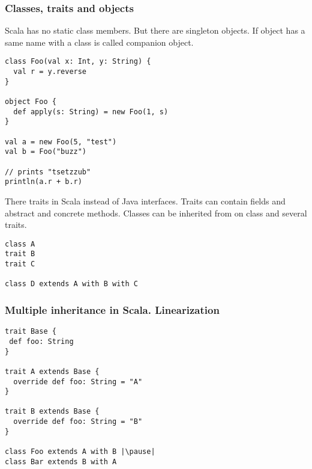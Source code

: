 \begin{frame}[fragile]
\frametitle{Classes, traits and objects}

Scala has no static class members. But there are singleton objects. If object has a same name with a class is called companion object.

\begin{lstlisting}
class Foo(val x: Int, y: String) {
  val r = y.reverse
}

object Foo {
  def apply(s: String) = new Foo(1, s)
}

val a = new Foo(5, "test")
val b = Foo("buzz")

// prints "tsetzzub"
println(a.r + b.r)
\end{lstlisting}

There traits in Scala instead of Java interfaces. Traits can contain fields and abstract and concrete methods. Classes can be inherited from on class and several traits.

\begin{lstlisting}
class A
trait B
trait C

class D extends A with B with C
\end{lstlisting}

\end{frame}

\begin{frame}[fragile]
\frametitle{Multiple inheritance in Scala. Linearization}


\pause

\begin{lstlisting}
trait Base {
 def foo: String
}

trait A extends Base {
  override def foo: String = "A"
}

trait B extends Base {
  override def foo: String = "B"
}

class Foo extends A with B |\pause|
class Bar extends B with A
\end{lstlisting}

\end{frame}

